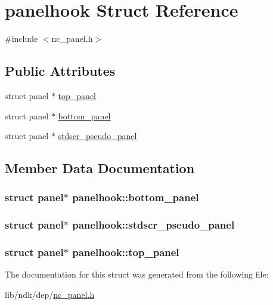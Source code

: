 \hypertarget{structpanelhook}{\section{panelhook Struct Reference}
\label{structpanelhook}
}


{\ttfamily \#include $<$nc\-\_\-panel.\-h$>$}

\subsection*{Public Attributes}
\begin{DoxyCompactItemize}
\item 
struct panel $\ast$ \hyperlink{structpanelhook_a73b56e3ce6c925fdfc11db33b62435cc}{top\-\_\-panel}
\item 
struct panel $\ast$ \hyperlink{structpanelhook_a7035b957e21b3eaf750290edfaf634d7}{bottom\-\_\-panel}
\item 
struct panel $\ast$ \hyperlink{structpanelhook_a57a00db32db6912d040155cdc83df304}{stdscr\-\_\-pseudo\-\_\-panel}
\end{DoxyCompactItemize}


\subsection{Member Data Documentation}
\hypertarget{structpanelhook_a7035b957e21b3eaf750290edfaf634d7}{
\subsubsection[{bottom\-\_\-panel}]{\setlength{\rightskip}{0pt plus 5cm}struct panel$\ast$ panelhook\-::bottom\-\_\-panel}}\label{structpanelhook_a7035b957e21b3eaf750290edfaf634d7}
\hypertarget{structpanelhook_a57a00db32db6912d040155cdc83df304}{
\subsubsection[{stdscr\-\_\-pseudo\-\_\-panel}]{\setlength{\rightskip}{0pt plus 5cm}struct panel$\ast$ panelhook\-::stdscr\-\_\-pseudo\-\_\-panel}}\label{structpanelhook_a57a00db32db6912d040155cdc83df304}
\hypertarget{structpanelhook_a73b56e3ce6c925fdfc11db33b62435cc}{
\subsubsection[{top\-\_\-panel}]{\setlength{\rightskip}{0pt plus 5cm}struct panel$\ast$ panelhook\-::top\-\_\-panel}}\label{structpanelhook_a73b56e3ce6c925fdfc11db33b62435cc}


The documentation for this struct was generated from the following file\-:\begin{DoxyCompactItemize}
\item 
lib/ndk/dep/\hyperlink{nc__panel_8h}{nc\-\_\-panel.\-h}\end{DoxyCompactItemize}

